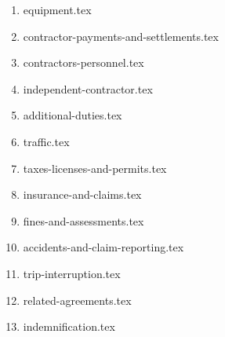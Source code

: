 \begin{enumerate}
    \item {equipment.tex}
    \item {contractor-payments-and-settlements.tex}
    \item {contractors-personnel.tex}
    \item {independent-contractor.tex}
    \item {additional-duties.tex}
    \item {traffic.tex}
    \item {taxes-licenses-and-permits.tex}
    \item {insurance-and-claims.tex}
    \item {fines-and-assessments.tex}
    \item {accidents-and-claim-reporting.tex}
    \item {trip-interruption.tex}
    \item {related-agreements.tex}
    \item {indemnification.tex}
\end{enumerate}
